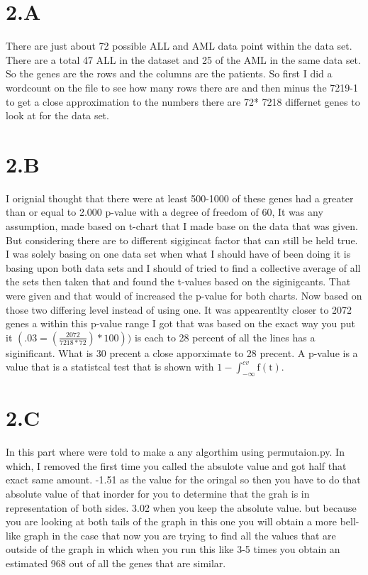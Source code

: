 \documentclass[12pt]{article}
\begin{document}
\begin{itemize}
\part{2.A}
 There are just about 72 possible ALL and AML data point within the data set. There are a total 47 ALL in the dataset  and 25 of the AML in the same data set. So the genes are the rows and the columns are the patients. So first I did a wordcount on the file to see how many rows there are and then minus the 7219-1 to get a close approximation to the numbers there are 72* 7218 differnet genes to look at for the data set.

\part{2.B}
		I orignial thought that there were at least 500-1000 of these genes had a greater than or equal to 2.000 p-value with a degree of freedom of 60, It was any assumption, made based on t-chart that I made base on the data that was given. But considering there are to different sigigincat factor that can still be held true. I was solely basing on one data set when what I should have of been doing it is basing upon both data sets and I should of tried to find a collective average of all the sets then taken that and found the t-values based on the siginigcants. That were given and that would of increased the p-value for both charts. Now based on those two differing level instead of using one. It was  appearentlty closer to 2072 genes a within this p-value range I got that was based on  the exact way you put it $(.03=(\frac{2072}{7218*72})*100))$ is each to 28 percent of all the lines has a siginificant. What is 30 precent a close apporximate to 28 precent. A p-value is a value that is a statistcal test that is shown with $1 - \int_{-\infty}^{cv} \mathrm{f(t)}$. 

\part{2.C}
    In this part where were told to make a any algorthim using permutaion.py. In which, I removed the first time you called the absulote value and got half that exact same amount. -1.51 as the value for the oringal so then you have to do that absolute value of that inorder for you to determine that the grah is in representation of both sides. 3.02 when you keep the absolute value. but because you are looking at both tails of the graph in this one you will obtain a more bell-like graph in the case that now you are trying to find all the values that are outside of the graph in which when  you run this like 3-5 times you obtain an estimated 968 out of all the genes that are similar. 

\end{itemize}
\end{document}
